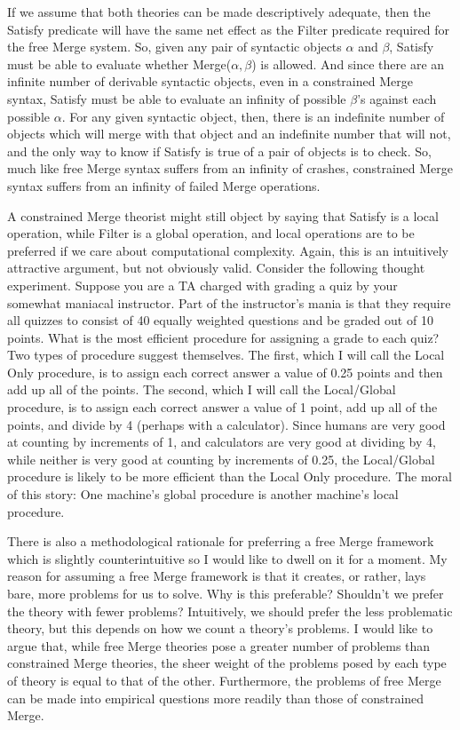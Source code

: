 If we assume that both theories can be made descriptively adequate, then the Satisfy predicate will have the same net effect as the Filter predicate required for the free Merge system.
So, given any pair of syntactic objects $\alpha$ and $\beta$, Satisfy must be able to evaluate whether Merge($\alpha,\beta$) is allowed.
And since there are an infinite number of derivable syntactic objects, even in a constrained Merge syntax, Satisfy must be able to evaluate an infinity of possible $\beta$'s against each possible $\alpha$.
For any given syntactic object, then, there is an indefinite number of objects which will merge with that object and an indefinite number that will not, and the only way to know if Satisfy is true of a pair of objects is to check.
So, much like free Merge syntax suffers from an infinity of crashes, constrained Merge syntax suffers from an infinity of failed Merge operations.

A constrained Merge theorist might still object by saying that Satisfy is a local operation, while Filter is a global operation, and local operations are to be preferred if we care about computational complexity.
Again, this is an intuitively attractive argument, but not obviously valid.
Consider the following thought experiment.
Suppose you are a TA charged with grading a quiz by your somewhat maniacal instructor.
Part of the instructor's mania is that they require all quizzes to consist of 40 equally weighted questions and be graded out of 10 points.
What is the most efficient procedure for assigning a grade to each quiz?
Two types of procedure suggest themselves.
The first, which I will call the Local Only procedure, is to assign each correct answer a value of 0.25 points and then add up all of the points.
The second, which I will call the Local/Global procedure, is to assign each correct answer a value of 1 point, add up all of the points, and divide by 4 (perhaps with a calculator).
Since humans are very good at counting by increments of 1, and calculators are very good at dividing by 4, while neither is very good at counting by increments of 0.25, the Local/Global procedure is likely to be more efficient than the Local Only procedure.
The moral of this story: One machine's global procedure is another machine's local procedure.

There is also a methodological rationale for preferring a free Merge framework which is slightly counterintuitive so I would like to dwell on it for a moment.
My reason for assuming a free Merge framework is that it creates, or rather, lays bare, more problems for us to solve.
Why is this preferable?
Shouldn't we prefer the theory with fewer problems?
Intuitively, we should prefer the less problematic theory, but this depends on how we count a theory's problems.
I would like to argue that, while free Merge theories pose a greater number of problems than constrained Merge theories, the sheer weight of the problems posed by each type of theory is equal to that of the other.
Furthermore, the problems of free Merge can be made into empirical questions more readily than those of constrained Merge.

